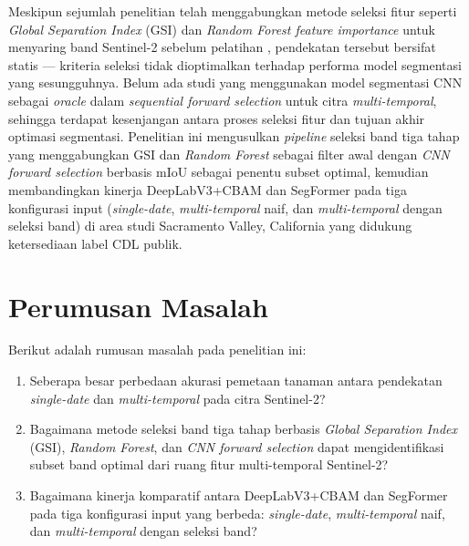 Meskipun sejumlah penelitian telah menggabungkan metode seleksi fitur seperti \textit{Global Separation Index} (GSI) dan \textit{Random Forest feature importance} untuk menyaring band Sentinel-2 sebelum pelatihan \citep{gao2023, yi2020}, pendekatan tersebut bersifat statis — kriteria seleksi tidak dioptimalkan terhadap performa model segmentasi yang sesungguhnya.
Belum ada studi yang menggunakan model segmentasi CNN sebagai \textit{oracle} dalam \textit{sequential forward selection} untuk citra \textit{multi-temporal}, sehingga terdapat kesenjangan antara proses seleksi fitur dan tujuan akhir optimasi segmentasi.
Penelitian ini mengusulkan \textit{pipeline} seleksi band tiga tahap yang menggabungkan GSI dan \textit{Random Forest} sebagai filter awal dengan \textit{CNN forward selection} berbasis mIoU sebagai penentu subset optimal, kemudian membandingkan kinerja DeepLabV3+CBAM dan SegFormer pada tiga konfigurasi input (\textit{single-date}, \textit{multi-temporal} naif, dan \textit{multi-temporal} dengan seleksi band) di area studi Sacramento Valley, California yang didukung ketersediaan label CDL publik. 

\section{Perumusan Masalah}
Berikut adalah rumusan masalah pada penelitian ini:
\begin{enumerate}
    \item Seberapa besar perbedaan akurasi pemetaan tanaman antara pendekatan \textit{single-date} dan \textit{multi-temporal} pada citra Sentinel-2?
    \item Bagaimana metode seleksi band tiga tahap berbasis \textit{Global Separation Index} (GSI), \textit{Random Forest}, dan \textit{CNN forward selection} dapat mengidentifikasi subset band optimal dari ruang fitur multi-temporal Sentinel-2?
    \item Bagaimana kinerja komparatif antara DeepLabV3+CBAM dan SegFormer pada tiga konfigurasi input yang berbeda: \textit{single-date}, \textit{multi-temporal} naif, dan \textit{multi-temporal} dengan seleksi band?
\end{enumerate}

